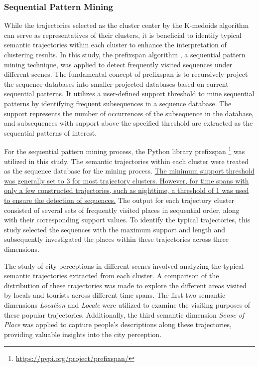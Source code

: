 \documentclass{article}
\theoremstyle{definition}
\theoremstyle{remark}
\begin{document}
\subsubsection{Sequential Pattern Mining}
While the trajectories selected as the cluster center by the K-medoids algorithm can serve as representatives of their clusters, it is beneficial to identify typical semantic trajectories within each cluster to enhance the interpretation of clustering results. In this study, the \acrfull{prefixspan} algorithm \citep{pei_mining_2004}, a sequential pattern mining technique, was applied to detect frequently visited sequences under different scenes. The fundamental concept of \acrshort{prefixspan} is to recursively project the sequence databases into smaller projected databases based on current sequential patterns. It utilizes a user-defined support threshold to mine sequential patterns by identifying frequent subsequences in a sequence database. The support represents the number of occurrences of the subsequence in the database, and subsequences with support above the specified threshold are extracted as the sequential patterns of interest.

For the sequential pattern mining process, the Python library prefixspan \footnote{\url{https://pypi.org/project/prefixspan/}} was utilized in this study. The semantic trajectories within each cluster were treated as the sequence database for the mining process. \underline{The minimum support threshold was generally set to 3 for most trajectory clusters. However, for time spans with only a few constructed trajectories, such as nighttime, a threshold of 1 was used to ensure the detection of sequences.} The output for each trajectory cluster consisted of several sets of frequently visited places in sequential order, along with their corresponding support values. To identify the typical trajectories, this study selected the sequences with the maximum support and length and subsequently investigated the places within these trajectories across three dimensions.

The study of city perceptions in different scenes involved analyzing the typical semantic trajectories extracted from each cluster. A comparison of the distribution of these trajectories was made to explore the different areas visited by locals and tourists across different time spans. The first two semantic dimensions \textit{Location} and \textit{Locale} were utilized to examine the visiting purposes of these popular trajectories. Additionally, the third semantic dimension \textit{Sense of Place} was applied to capture people's descriptions along these trajectories, providing valuable insights into the city perception.
\end{document}
